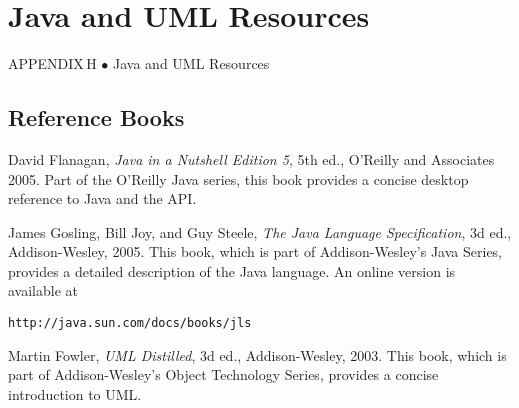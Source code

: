 \setcounter{table}{0}
\setcounter{figure}{0}
\renewcommand{\thetable}{\mbox{H.\arabic{table}}}%
\renewcommand{\thefigure}{\mbox{H--\arabic{figure}}}%
%

\chapter{Java and UML Resources}

{{\color{cyan}APPENDIX\,H\,\,$\bullet$\,\,}Java and UML Resources}

\section*{Reference Books}
\label{reference-books}
\begin{BL}

\item  David Flanagan, {\it Java in a Nutshell Edition 5}, 5th ed.,
O'Reilly and Associates 2005. Part of the O'Reilly Java series, this
book provides a concise desktop reference to Java and the API.

\item  James Gosling, Bill Joy, and Guy Steele, {\it The Java
Language Specification}, 3d ed., Addison-Wesley, 2005. This book,
which is part of Addison-Wesley's Java Series, provides a detailed
description of the Java language.  An online version is available at

\WWW
\begin{jjjlisting}
\begin{lstlisting}[commentstyle=\color{black}]
http://java.sun.com/docs/books/jls
\end{lstlisting}
\end{jjjlisting}

\item  Martin Fowler, {\it UML Distilled}, 3d ed., 
Addison-Wesley, 2003. This book, which is part of Addison-Wesley's
Object Technology Series, provides a concise introduction to UML.
\end{BL}

